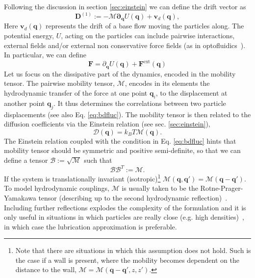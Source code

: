 \documentclass[ twoside,openright,titlepage,numbers=noenddot,%
headinclude,footinclude,cleardoublepage=empty,abstract=on,
BCOR=5mm,paper=b5,fontsize=11pt, dvipsnames
]{scrreprt}
\renewcommand{\vec}[1]{\bm{#1}}
\newcommand{\tens}[1]{\bm{\mathcal{#1}}}
\newcommand{\kT}{k_B T}
\newcommand{\ppos}{q}
\begin{document}
Following the discussion in section \ref{sec:einstein} we can define the drift vector as
\begin{equation}
  \label{eq:bddrift}
\vec{D}^{(1)} := -\tens{M}\vec{\partial}_{\vec{\ppos}}U(\vec{\ppos}) + \vec{v}_d(\vec{\ppos}),
\end{equation}
Here  $\vec{v}_d(\vec{\ppos})$ represents the drift of a base flow moving the particles along. The potential energy, $U$, acting on the particles can include pairwise interactions, external fields and/or external non conservative force fields (as in optofluidics~\cite{Melendez2019}). In particular, we can define
\begin{equation}
  \vec{F} = \partial_{\vec{q}}U(\vec{q}) + \vec{F}^{\text{ext}}(\vec{q})
\end{equation}
Let us focus on the dissipative part of the dynamics, encoded in the mobility tensor. The pairwise mobility tensor, $\tens{M}$, encodes in its elements the hydrodynamic transfer of the force at one point $\vec{q}_i$, to the displacement at another point $\vec{q}_j$. It thus determines the correlations between two particle displacements (see also Eq. \eqref{eq:bdfluc}).
The mobility tensor is then related to the diffusion coefficients via the Einstein relation (see sec. \ref{sec:einstein}),
\begin{equation}
  \label{eq:bdeinstein}
  \tens{D}(\vec{\ppos}) = \kT \tens{M}(\vec{\ppos}).
\end{equation}
The Einstein relation coupled with the condition in Eq. \eqref{eq:bdfluc} hints that mobility tensor should be symmetric and positive semi-definite, so that we can define a tensor $\tens{B}:=\sqrt{\tens{M}}$ such that
\begin{equation}
  \tens{B}\tens{B}^T := \tens{M}.
\end{equation}
If the system is translationally invariant (isotropic)\footnote{Note that there are situations in which this assumption does not hold. Such is the case if a wall is present, where the mobility becomes dependent on the distance to the wall, $\tens{M}=\tens{M}(\vec{q}-\vec{q}', z, z')$.} $\tens{M}(\vec{\ppos}, \vec{\ppos}') = \tens{M}(\vec{\ppos}-\vec{\ppos}')$. To model hydrodynamic couplings, $\tens{M}$ is usually taken to be the Rotne-Prager-Yamakawa tensor (describing up to the second hydrodynamic reflection)~\cite{Dhont1996}. Including further reflections explodes the complexity of the formulation and it is only useful in situations in which particles are really close (e.g. high densities)~\cite{Dhont1996}, in which case the lubrication approximation is preferable.
\end{document}
